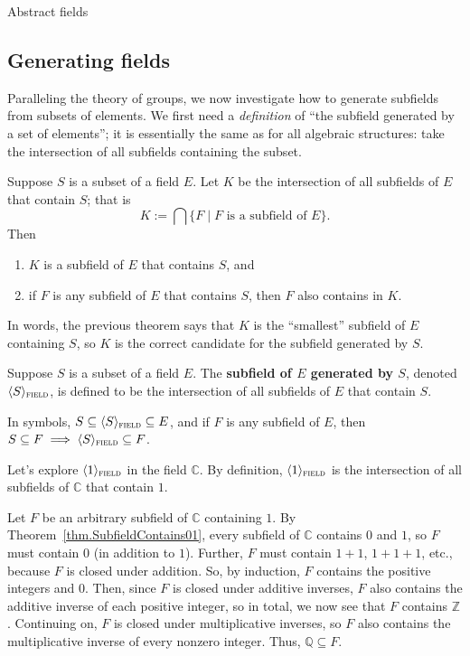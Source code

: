 \begin{section}{Abstract fields}
\subsection{Generating fields}
Paralleling the theory of groups, we now investigate how to generate subfields from subsets of elements. We first need a \emph{definition} of ``the subfield generated by a set of elements'';  it is essentially the same as for all algebraic structures: take the intersection of all subfields containing the subset.

\begin{theorem}\label{thm.IntersectFields}
Suppose $S$ is a subset of a field $E$. Let $K$ be the intersection of all subfields of $E$ that contain $S$; that is \[K:=\bigcap\{F\mid \text{$F$ is a subfield of $E$}\}.\]
Then 
\begin{enumerate}
\item $K$ is a subfield of $E$ that contains $S$, and
\item if $F$ is any subfield of $E$ that contains $S$, then $F$ also contains in $K$.
\end{enumerate}
\end{theorem}

In words, the previous theorem says that $K$ is the ``smallest'' subfield of $E$ containing $S$, so  $K$ is the correct candidate for the subfield generated by $S$.

\begin{definition}\label{def.GenerateField}
Suppose $S$ is a subset of a field $E$. The \textbf{subfield of $E$ generated by $S$}, denoted $\langle S \rangle_{\textsc{field}}$, is defined to be the intersection of all subfields of $E$ that contain $S$.
\end{definition}

In symbols, $S \subseteq \langle S \rangle_{\textsc{field}} \subseteq E$, and if $F$ is any subfield of $E$, then $S\subseteq F\implies \langle S \rangle_{\textsc{field}} \subseteq F$.

\begin{example}\label{exam.GenerateField}
Let's explore  $\langle 1 \rangle_{\textsc{field}}$ in the field $\mathbb{C}$. By definition,  $\langle 1 \rangle_{\textsc{field}}$ is the intersection of all subfields of $\mathbb{C}$ that contain $1$. 

Let $F$ be an arbitrary subfield of $\mathbb{C}$ containing $1$. By Theorem~\ref{thm.SubfieldContains01}, every subfield of $\mathbb{C}$ contains $0$ and $1$, so $F$ must  contain $0$ (in addition to $1$). Further, $F$ must contain $1+1$, $1+1+1$, etc., because $F$ is closed under addition. So, by induction,  $F$ contains the positive integers and $0$. Then, since $F$ is closed under additive inverses, $F$ also contains the additive inverse of each positive integer, so in total, we now see that $F$ contains $\mathbb{Z}$. Continuing on, $F$ is closed under multiplicative inverses, so $F$ also contains the multiplicative inverse of every nonzero integer. Thus, $\mathbb{Q} \subseteq F$. 


\end{example}
\end{section}

